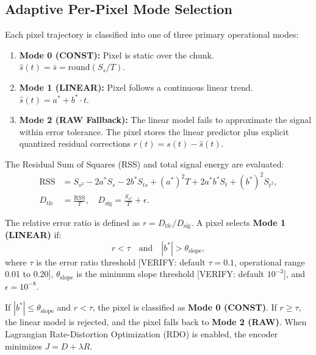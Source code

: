 \documentclass[conference]{IEEEtran}
\begin{document}
\subsection{Adaptive Per-Pixel Mode Selection}
Each pixel trajectory is classified into one of three primary operational modes:
\begin{enumerate}
    \item \textbf{Mode 0 (CONST):} Pixel is static over the chunk. $\hat{s}(t) = \bar{s} = \text{round}(S_s / T)$.
    \item \textbf{Mode 1 (LINEAR):} Pixel follows a continuous linear trend. $\hat{s}(t) = a^* + b^* \cdot t$.
    \item \textbf{Mode 2 (RAW Fallback):} The linear model fails to approximate the signal within error tolerance. The pixel stores the linear predictor plus explicit quantized residual corrections $r(t) = s(t) - \hat{s}(t)$.
\end{enumerate}

The Residual Sum of Squares (RSS) and total signal energy are evaluated:
\begin{align}
    \text{RSS} &= S_{s^2} - 2a^* S_s - 2b^* S_{ts} + (a^*)^2 T + 2a^* b^* S_t + (b^*)^2 S_{t^2}, \\
    D_{\text{tfc}} &= \frac{\text{RSS}}{T}, \quad D_{\text{sig}} = \frac{S_{s^2}}{T} + \epsilon.
\end{align}

The relative error ratio is defined as $r = D_{\text{tfc}} / D_{\text{sig}}$. A pixel selects \textbf{Mode 1 (LINEAR)} if:
\begin{equation}
    r < \tau \quad \text{and} \quad |b^*| > \theta_{\text{slope}},
\end{equation}
where $\tau$ is the error ratio threshold [VERIFY: default $\tau = 0.1$, operational range 0.01 to 0.20], $\theta_{\text{slope}}$ is the minimum slope threshold [VERIFY: default $10^{-3}$], and $\epsilon = 10^{-8}$.

If $|b^*| \le \theta_{\text{slope}}$ and $r < \tau$, the pixel is classified as \textbf{Mode 0 (CONST)}. If $r \ge \tau$, the linear model is rejected, and the pixel falls back to \textbf{Mode 2 (RAW)}. When Lagrangian Rate-Distortion Optimization (RDO) is enabled, the encoder minimizes $J = D + \lambda R$.
\end{document}
